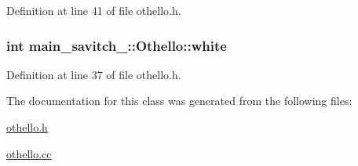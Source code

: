 Definition at line 41 of file othello.\+h.

\subsubsection[{\texorpdfstring{white}{white}}]{\setlength{\rightskip}{0pt plus 5cm}int main\+\_\+savitch\+\_\+::\+Othello\+::white\hspace{0.3cm}{\ttfamily [protected]}}\hypertarget{classmain__savitch__14_1_1_othello_a7d5f59b1e581ed7a8145debeecf4f310}{}\label{classmain__savitch__14_1_1_othello_a7d5f59b1e581ed7a8145debeecf4f310}


Definition at line 37 of file othello.\+h.



The documentation for this class was generated from the following files\+:\begin{DoxyCompactItemize}
\item 
\hyperlink{othello_8h}{othello.\+h}\item 
\hyperlink{othello_8cc}{othello.\+cc}\end{DoxyCompactItemize}

